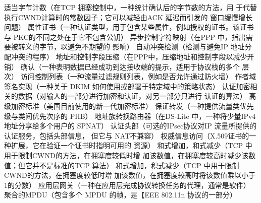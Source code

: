 适当字节计数（在TCP 拥塞控制中，一种统计确认后的字节数的方法，用
于代替执行CWND计算时的常数因子；它可以减轻由ACK 延迟而引发的
窗口缓慢增长问题）
属性证书（一种认证类型，用于包含某些属性，例如授权的证书。该证书与
PKC的不同之处在于它不包含公钥）
异步控制字符映射（在PPP 中，指出需要被转义的字节，以避免不期望的
影响）
自动冲突检测（检测与避免IP 地址分配冲突的程序）
地址和控制字段压缩（在PPP中，压缩地址和控制字段以减少开销）
确认（一种表明数据已经成功到达接收端的提示，适用于协议栈的多个
层次）
访问控制列表（一种流量过滤规则列表，例如是否允许通过防火墙）
作者域签名实现（一种关于 DKIM 如何使用或部署于特定域中的策略状态）
认证加密相关的数据（对输人的一部分进行加密和认证，对另一部分只进行
认证的算法）
高级加密标准（美国目前使用的新一代加密标准）
保证转发（一种提供流量类优先级与类间优先次序的 PHB）
地址族转换路由器（在DS-Lite 中，一种将少量IPv4地址分享给多个用户的
SPNAT）
认证头部（可选的IPsec协议对IP 流量所提供的认证服务，包括头部信息，
但它与 NAT不兼容）
权威信息访问（X.509证书的一种扩展，它在验证一个证书时指明可用的
资源）
和式增加，和式减少（TCP 中用于限制CWND的方法，在拥塞度较低时增
加该数值，在拥塞度较高时减少该数值；但它并不是标准的TCP 算法）
和式增加，积式减少（TCP 中用于限制CWND的方法，在拥塞度较低时增
加该数值，在拥塞度较高时将该数值乘以小于1的分数）
应用层网关（一种在应用层完成协议转换任务的代理，通常是软件）
聚合的MPDU（包含多个 MPDU 的帧，是【EEE 802.11n 协议的一部分）
